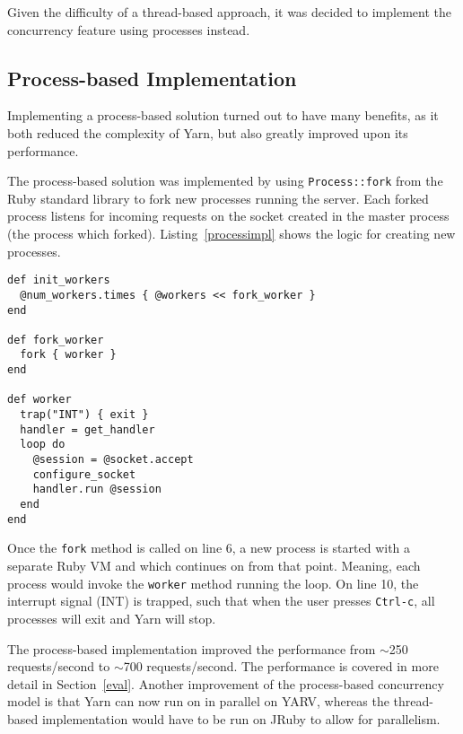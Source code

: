 Given the difficulty of a thread-based approach, it was decided to implement
the concurrency feature using processes instead.

\subsection{Process-based Implementation}
Implementing a process-based solution turned out to have many benefits, as it
both reduced the complexity of Yarn, but also greatly improved upon its
performance.

The process-based solution was implemented by using \texttt{Process::fork}
from the Ruby standard library to fork new processes running the server. Each forked
process listens for incoming requests on the socket created in the master
process (the process which forked). Listing~\ref{processimpl} shows the logic for creating new processes.

\bigskip
\begin{lstlisting}[label=processimpl,caption=Process-based implementation
(Yarn/lib/yarn/server.rb:75)]
def init_workers
  @num_workers.times { @workers << fork_worker }
end

def fork_worker
  fork { worker }
end

def worker
  trap("INT") { exit }
  handler = get_handler
  loop do
    @session = @socket.accept
    configure_socket
    handler.run @session
  end
end
\end{lstlisting}

Once the \texttt{fork} method is called on line 6, a new process is started
with a separate Ruby VM and which continues on from that point. Meaning, each
process would invoke the \texttt{worker} method running the loop. On line 10, the
interrupt signal (INT) is trapped, such that when the user presses
\texttt{Ctrl-c}, all processes will exit and Yarn will stop. 

The process-based implementation improved the performance from $\sim$250
requests/second to $\sim$700 requests/second. The performance is covered in
more detail in Section~\ref{eval}. Another improvement of the process-based
concurrency model is that Yarn can now run on in parallel on YARV, whereas the
thread-based implementation would have to be run on JRuby to allow for
parallelism.

